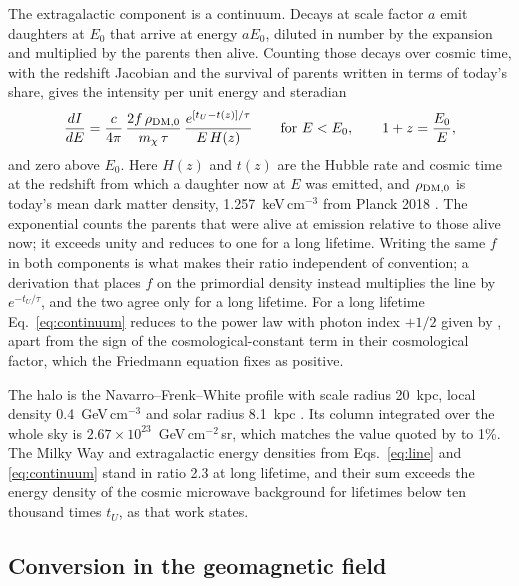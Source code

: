 \documentclass[11pt]{article}
\begin{document}
The extragalactic component is a continuum. Decays at scale factor $a$ emit daughters at $E_0$ that arrive at energy $aE_0$, diluted in number by the expansion and multiplied by the parents then alive. Counting those decays over cosmic time, with the redshift Jacobian and the survival of parents written in terms of today's share, gives the intensity per unit energy and steradian
\begin{equation}
\frac{dI}{dE}=\frac{c}{4\pi}\,\frac{2f\,\rho_{{\rm DM},0}}{m_\chi\,\tau}\,\frac{e^{[t_U-t(z)]/\tau}}{E\,H(z)}\qquad\text{for } E<E_0,\qquad 1+z=\frac{E_0}{E},
\label{eq:continuum}
\end{equation}
and zero above $E_0$. Here $H(z)$ and $t(z)$ are the Hubble rate and cosmic time at the redshift from which a daughter now at $E$ was emitted, and $\rho_{{\rm DM},0}$ is today's mean dark matter density, 1.257~keV\,cm$^{-3}$ from Planck 2018 \citep{planck2018params}. The exponential counts the parents that were alive at emission relative to those alive now; it exceeds unity and reduces to one for a long lifetime. Writing the same $f$ in both components is what makes their ratio independent of convention; a derivation that places $f$ on the primordial density instead multiplies the line by $e^{-t_U/\tau}$, and the two agree only for a long lifetime. For a long lifetime Eq.~\eqref{eq:continuum} reduces to the power law with photon index $+1/2$ given by \citet{yamamoto2020alp}, apart from the sign of the cosmological-constant term in their cosmological factor, which the Friedmann equation fixes as positive.

The halo is the Navarro--Frenk--White profile with scale radius 20~kpc, local density 0.4~GeV\,cm$^{-3}$ and solar radius 8.1~kpc \citep{navarro1996nfw}. Its column integrated over the whole sky is $2.67\times10^{23}$~GeV\,cm$^{-2}$\,sr, which matches the value quoted by \citet{dror2021cosmic} to 1\%. The Milky Way and extragalactic energy densities from Eqs.~\eqref{eq:line} and \eqref{eq:continuum} stand in ratio 2.3 at long lifetime, and their sum exceeds the energy density of the cosmic microwave background for lifetimes below ten thousand times $t_U$, as that work states.

\subsection{Conversion in the geomagnetic field}
\end{document}
